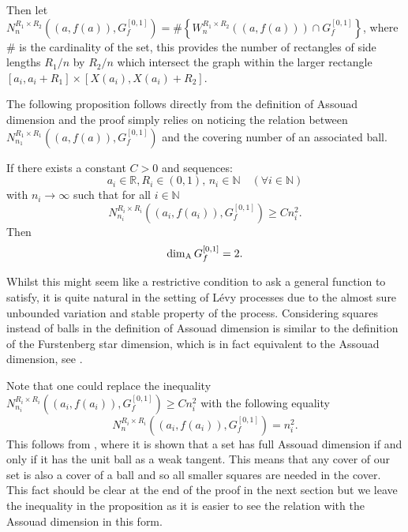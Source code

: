 Then let $N_{n}^{R_1 \times R_2 }((a,f(a)),G_f^{[0,1]})= \# \left\{ W_{n}^{R_1\times R_2}((a,f(a))) \cap G_f^{[0,1]} \right\}$, where $\#$ is the cardinality of the set, this provides the number of rectangles of side lengths $R_1/n$ by $R_2/n$ which intersect the graph within the larger rectangle $[a_i, a_i + R_1] \times [X(a_i), X(a_i) + R_2]$.


The following proposition follows directly from the definition of Assouad dimension and the proof simply relies on noticing the relation between \newline$N_{n_1}^{R_1 \times R_1 }((a,f(a)),G_f^{[0,1]})$ and the covering number of an associated ball.


\begin{proposition}\label{graph}
	If there exists a constant $C>0$ and sequences:
	\[
	a_i\in \mathbb{R},R_i\in (0,1),\, n_i\in\mathbb{N} \quad (\forall i\in \mathbb{N})
	\]
	with $n_i \rightarrow \infty$ such that for all $i\in\mathbb{N}$
	\[
	N_{n_i}^{R_i \times R_i }((a_i,f(a_i)),G_f^{[0,1]})\geq C n_i^2.
	\]
	Then
	\[
	\dim_{\textup{A}} G_f^{[0,1]}=2.
	\]
\end{proposition}

Whilst this might seem like a restrictive condition to ask a general function to satisfy, it is quite natural in the setting of L\'evy processes due to the almost sure unbounded variation and stable property of the process. Considering squares instead of balls in the definition of Assouad dimension is similar to the definition of the Furstenberg star dimension, which is in fact equivalent to the Assouad dimension, see \cite{chenwuwu}.

Note that one could replace the inequality $N_{n_i}^{R_i \times R_i }((a_i,f(a_i)),G_f^{[0,1]})\geq C n_i^2$ with the following equality
\[
N_{n}^{R_i \times R_i }((a_i,f(a_i)),G_f^{[0,1]})= n_i^2.
\]
This follows from \cite[Theorem 2.4]{FY}, where it is shown that a set has full Assouad dimension if and only if it has the unit ball as a weak tangent. This means that any cover of our set is also a cover of a ball and so all smaller squares are needed in the cover. This fact should be clear at the end of the proof in the next section but we leave the inequality in the proposition as it is easier to see the relation with the Assouad dimension in this form.


